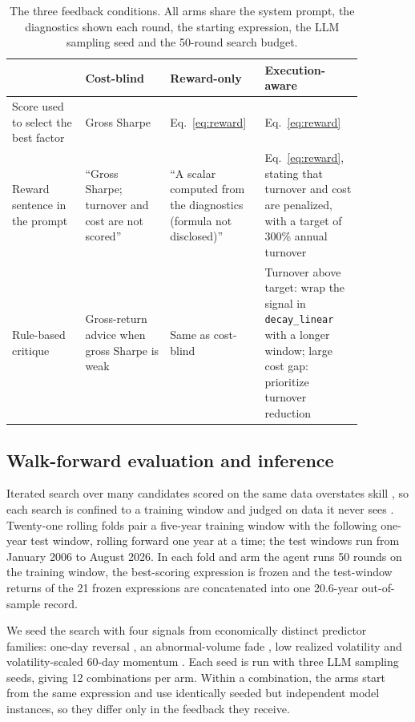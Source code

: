 \documentclass[preprint,12pt,authoryear]{elsarticle}
\begin{document}
\begin{table}[t]
\centering
\caption{The three feedback conditions. All arms share the system prompt, the diagnostics shown each round, the starting expression, the LLM sampling seed and the 50-round search budget.}
\label{tab:arms}
\footnotesize
\begin{tabular}{>{\raggedright\arraybackslash}p{0.19\linewidth}>{\raggedright\arraybackslash}p{0.22\linewidth}>{\raggedright\arraybackslash}p{0.22\linewidth}>{\raggedright\arraybackslash}p{0.24\linewidth}}
\toprule
 & Cost-blind & Reward-only & Execution-aware \\
\midrule
Score used to select the best factor & Gross Sharpe & Eq.~\eqref{eq:reward} & Eq.~\eqref{eq:reward} \\
\addlinespace
Reward sentence in the prompt & ``Gross Sharpe; turnover and cost are not scored'' & ``A scalar computed from the diagnostics (formula not disclosed)'' & Eq.~\eqref{eq:reward}, stating that turnover and cost are penalized, with a target of 300\% annual turnover \\
\addlinespace
Rule-based critique & Gross-return advice when gross Sharpe is weak & Same as cost-blind & Turnover above target: wrap the signal in \texttt{decay\_linear} with a longer window; large cost gap: prioritize turnover reduction \\
\bottomrule
\end{tabular}
\end{table}

\subsection{Walk-forward evaluation and inference}\label{sec:wfo}

Iterated search over many candidates scored on the same data overstates skill \citep{bailey2014}, so each search is confined to a training window and judged on data it never sees \citep{lopezdeprado2018}. Twenty-one rolling folds pair a five-year training window with the following one-year test window, rolling forward one year at a time; the test windows run from January 2006 to August 2026. In each fold and arm the agent runs 50 rounds on the training window, the best-scoring expression is frozen and the test-window returns of the 21 frozen expressions are concatenated into one 20.6-year out-of-sample record.

We seed the search with four signals from economically distinct predictor families: one-day reversal \citep{jegadeesh1990}, an abnormal-volume fade \citep{gervais2001}, low realized volatility \citep{ang2006} and volatility-scaled 60-day momentum \citep{jegadeesh1993}. Each seed is run with three LLM sampling seeds, giving 12 combinations per arm. Within a combination, the arms start from the same expression and use identically seeded but independent model instances, so they differ only in the feedback they receive.
\end{document}

